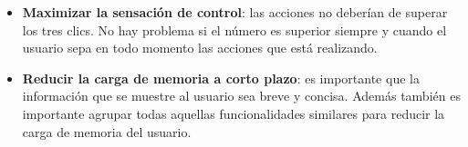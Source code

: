 \begin{itemize}
	\item \textbf{Maximizar la sensación de control}: las acciones no deberían de superar los tres clics. No hay problema si el número es superior siempre y cuando el usuario sepa en todo momento las acciones que está realizando. 
	
	\item \textbf{Reducir la carga de memoria a corto plazo}: es importante que la información que se muestre al usuario sea breve y concisa. Además también es importante agrupar todas aquellas funcionalidades similares para reducir la carga de memoria del usuario.
	
\end{itemize}


